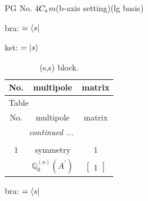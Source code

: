\documentclass[fleqn,8pt,landscape]{jsarticle}
\begin{document}
\setcounter{MaxMatrixCols}{32}

\renewcommand{\tablename}{Table~}
\renewcommand{\figurename}{Figure~}
\begin{center}
\LARGE
PG No. 4\quad$C_{\rm s}$\quad$m$\quad(b-axis setting)\quad[ monoclinic ] (lg basis)
\end{center}
bra: $=\bra{s}$

\noindent
ket: $=\ket{s}$
\renewcommand{\arraystretch}{1.6}
\begin{longtable}{ccc}
\caption{(s,s) block.}
 \\
 \hline \hline
No. & multipole & matrix \\ \hline \endfirsthead

\multicolumn{2}{l}{\tablename\ \thetable{}} \\
 \hline \hline
No. & multipole & matrix \\ \hline \endhead

 \hline \hline
\multicolumn{2}{r}{\footnotesize\it continued ...} \\ \endfoot

 \hline \hline
\multicolumn{2}{r}{} \\ \endlastfoot

$ 1 $ & $ \text{symmetry} $ & $ 1 $ \\
$  $ & $ \mathbb{Q}_{0}^{(a)}(A^{\prime}) $ & $ \begin{bmatrix} 1 \end{bmatrix} $ \\ \hline
\end{longtable}
bra: $=\bra{s}$
\end{document}
